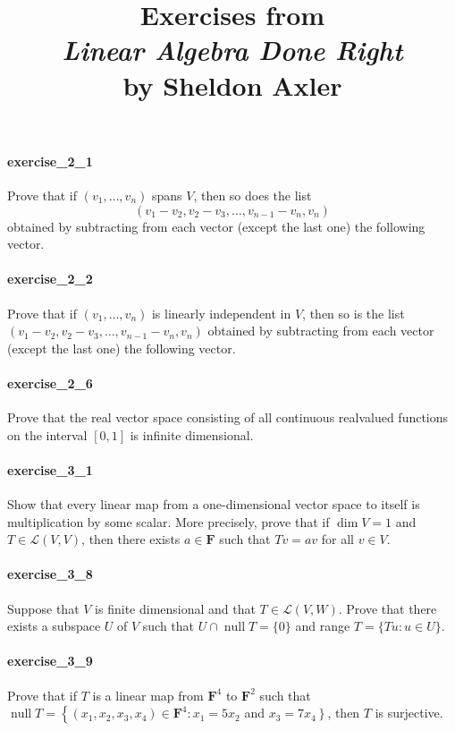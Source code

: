\documentclass{article}
\title{\textbf{
Exercises from \\
\textit{Linear Algebra Done Right} \\
by Sheldon Axler
}}
\date{}
\begin{document}
\maketitle

\paragraph{exercise\_2\_1} Prove that if $\left(v_{1}, \ldots, v_{n}\right)$ spans $V$, then so does the list \[\left(v_{1}-v_{2}, v_{2}-v_{3}, \ldots, v_{n-1}-v_{n}, v_{n}\right)\] obtained by subtracting from each vector (except the last one) the following vector.

\paragraph{exercise\_2\_2} Prove that if $\left(v_{1}, \ldots, v_{n}\right)$ is linearly independent in $V$, then so is the list $\left(v_{1}-v_{2}, v_{2}-v_{3}, \ldots, v_{n-1}-v_{n}, v_{n}\right)$ obtained by subtracting from each vector (except the last one) the following vector.

\paragraph{exercise\_2\_6} Prove that the real vector space consisting of all continuous realvalued functions on the interval $[0,1]$ is infinite dimensional.

\paragraph{exercise\_3\_1} Show that every linear map from a one-dimensional vector space to itself is multiplication by some scalar. More precisely, prove that if $\operatorname{dim} V=1$ and $T \in \mathcal{L}(V, V)$, then there exists $a \in \mathbf{F}$ such that $T v=a v$ for all $v \in V$.

\paragraph{exercise\_3\_8} Suppose that $V$ is finite dimensional and that $T \in \mathcal{L}(V, W)$. Prove that there exists a subspace $U$ of $V$ such that $U \cap \operatorname{null} T=\{0\}$ and range $T=\{T u: u \in U\}$.

\paragraph{exercise\_3\_9} Prove that if $T$ is a linear map from $\mathbf{F}^{4}$ to $\mathbf{F}^{2}$ such that $\operatorname{null} T=\left\{\left(x_{1}, x_{2}, x_{3}, x_{4}\right) \in \mathbf{F}^{4}: x_{1}=5 x_{2}\right.$ and $\left.x_{3}=7 x_{4}\right\}$, then $T$ is surjective.
\end{document}

